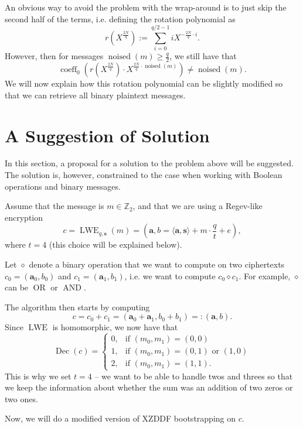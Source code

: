An obvious way to avoid the problem with the wrap-around is to just skip the second half of the terms, i.e. defining the rotation polynomial as
$$r(X^{\frac{2N}{q}}) := \sum_{i=0}^{q/2-1} iX^{- \frac{2N}{q} \cdot i}.$$
However, then for messages $\operatorname{noised}(m) \geq \frac{q}{2}$, we still have that
$$\operatorname{coeff}_0 \left(r(X^{\frac{2N}{q}}) \cdot X^{\frac{2N}{q} \cdot \operatorname{noised}(m)}\right) \neq \operatorname{noised}(m).$$
We will now explain how this rotation polynomial can be slightly modified so that we can retrieve all binary plaintext messages.


\section{A Suggestion of Solution}

In this section, a proposal for a solution to the problem above will be suggested. The solution is, however, constrained to the case when working with Boolean operations and binary messages.

Assume that the message is $m \in \mathbb{Z}_2$, and that we are using a Regev-like encryption
$$c = \operatorname{LWE}_{q,\mathbf{s}}(m) = \left(\mathbf{a}, b = \langle \mathbf{a}, \mathbf{s} \rangle + m \cdot \frac{q}{t} + e\right),$$
where $t=4$ (this choice will be explained below).

Let $\diamond$ denote a binary operation that we want to compute on two ciphertexts $c_0 = (\mathbf{a}_0,b_0)$ and $c_1 = (\mathbf{a}_1,b_1)$, i.e. we want to compute $c_0 \diamond c_1$. For example, $\diamond$ can be $\operatorname{OR}$ or $\operatorname{AND}$.

The algorithm then starts by computing
$$c = c_0 + c_1 = (\mathbf{a}_0 + \mathbf{a}_1, b_0 + b_1) =: (\mathbf{a},b).$$
Since $\operatorname{LWE}$ is homomorphic, we now have that
\begin{equation*}
  \operatorname{Dec}(c) =
    \begin{cases}
      0, & \text{if $(m_0, m_1) = (0,0)$} \\
      1, & \text{if $(m_0, m_1) = (0,1)$ or $(1,0)$}\\
      2, & \text{if $(m_0, m_1) = (1,1)$}.
    \end{cases}
\end{equation*}
This is why we set $t=4$ -- we want to be able to handle twos and threes so that we keep the information about whether the sum was an addition of two zeros or two ones.

Now, we will do a modified version of XZDDF bootstrapping on $c$.

